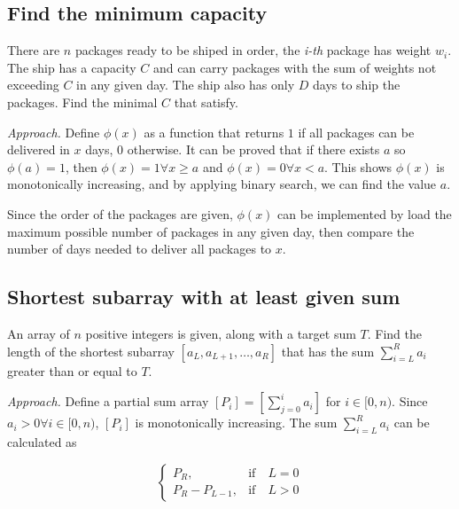 \documentclass{article}
\begin{document}
    \subsection{Find the minimum capacity}

    \begin{statement}{}{}
        There are $n$ packages ready to be shiped in order, the \emph{i-th} package has weight $w_i$. The ship has a capacity $C$ and can carry packages with the sum of weights not exceeding $C$ in any given day. The ship also has only $D$ days to ship the packages. Find the minimal $C$ that satisfy.
    \end{statement}

    \emph{Approach.} Define $\phi(x)$ as a function that returns $1$ if all packages can be delivered in $x$ days, $0$ otherwise. It can be proved that if there exists $a$ so $\phi(a) = 1$, then $\phi(x) = 1 \forall x \ge a$ and $\phi(x) = 0 \forall x < a$. This shows $\phi(x)$ is monotonically increasing, and by applying binary search, we can find the value $a$.

    Since the order of the packages are given, $\phi(x)$ can be implemented by load the maximum possible number of packages in any given day, then compare the number of days needed to deliver all packages to $x$.


    \subsection{Shortest subarray with at least given sum}

    \begin{statement}{}{}
        An array of $n$ positive integers is given, along with a target sum $T$. Find the length of the shortest subarray $[a_L, a_{L+1}, \dots, a_R]$ that has the sum $\sum_{i=L}^{R} a_i$ greater than or equal to $T$.
    \end{statement}

    \emph{Approach.} Define a partial sum array $[P_i] = [\sum_{j=0}^{i} a_i]$ for $i \in [0, n)$. Since $a_i > 0 \forall i \in [0, n)$, $[P_i]$ is monotonically increasing. The sum $\sum_{i=L}^{R} a_i$ can be calculated as

    \begin{equation*}
        \begin{cases}
            P_R, &\text{if} \quad L = 0 \\
            P_R - P_{L-1}, &\text{if} \quad L > 0
        \end{cases}
    \end{equation*}
\end{document}
